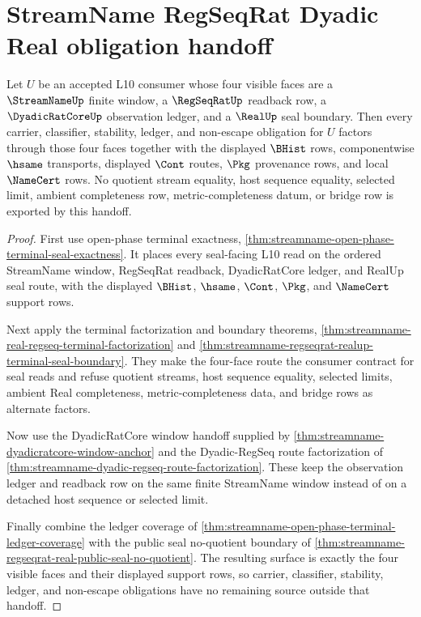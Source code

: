 \section{StreamName RegSeqRat Dyadic Real obligation handoff}
\label{sec:streamname-regseqrat-dyadic-real-obligation-handoff}

\begin{theorem}
\label{thm:streamname-regseqrat-dyadic-real-obligation-handoff}
Let $U$ be an accepted L10 consumer whose four visible faces are a $\StreamNameUp$ finite window, a $\RegSeqRatUp$ readback row, a $\DyadicRatCoreUp$ observation ledger, and a $\RealUp$ seal boundary. Then every carrier, classifier, stability, ledger, and non-escape obligation for $U$ factors through those four faces together with the displayed $\BHist$ rows, componentwise $\hsame$ transports, displayed $\Cont$ routes, $\Pkg$ provenance rows, and local $\NameCert$ rows. No quotient stream equality, host sequence equality, selected limit, ambient completeness row, metric-completeness datum, or bridge row is exported by this handoff.
\end{theorem}
\begin{proof}
First use open-phase terminal exactness, \autoref{thm:streamname-open-phase-terminal-seal-exactness}. It places every seal-facing L10 read on the ordered StreamName window, RegSeqRat readback, DyadicRatCore ledger, and RealUp seal route, with the displayed $\BHist$, $\hsame$, $\Cont$, $\Pkg$, and $\NameCert$ support rows.

Next apply the terminal factorization and boundary theorems, \autoref{thm:streamname-real-regseq-terminal-factorization} and \autoref{thm:streamname-regseqrat-realup-terminal-seal-boundary}. They make the four-face route the consumer contract for seal reads and refuse quotient streams, host sequence equality, selected limits, ambient Real completeness, metric-completeness data, and bridge rows as alternate factors.

Now use the DyadicRatCore window handoff supplied by \autoref{thm:streamname-dyadicratcore-window-anchor} and the Dyadic-RegSeq route factorization of \autoref{thm:streamname-dyadic-regseq-route-factorization}. These keep the observation ledger and readback row on the same finite StreamName window instead of on a detached host sequence or selected limit.

Finally combine the ledger coverage of \autoref{thm:streamname-open-phase-terminal-ledger-coverage} with the public seal no-quotient boundary of \autoref{thm:streamname-regseqrat-real-public-seal-no-quotient}. The resulting surface is exactly the four visible faces and their displayed support rows, so carrier, classifier, stability, ledger, and non-escape obligations have no remaining source outside that handoff.
\end{proof}

